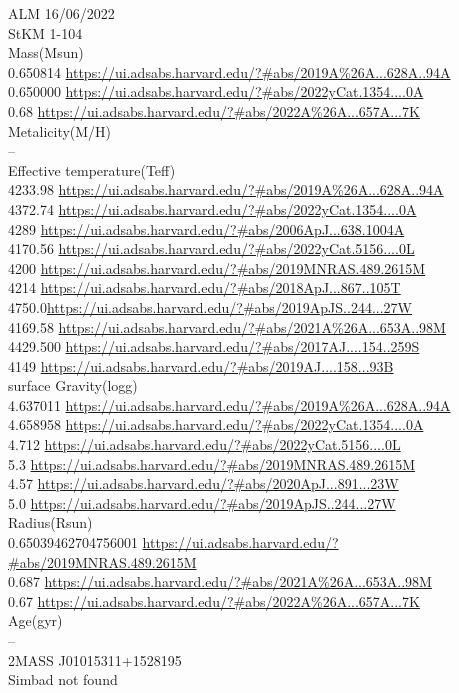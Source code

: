 ALM 16/06/2022\\
StKM 1-104\\
Mass(Msun)\\
0.650814 \url{https://ui.adsabs.harvard.edu/?#abs/2019A%26A...628A..94A}\\
0.650000 \url{https://ui.adsabs.harvard.edu/?#abs/2022yCat.1354....0A}\\
0.68  \url{https://ui.adsabs.harvard.edu/?#abs/2022A%26A...657A...7K}\\
Metalicity(M/H)\\
--\\
Effective temperature(Teff)\\
4233.98 \url{https://ui.adsabs.harvard.edu/?#abs/2019A%26A...628A..94A}\\
4372.74 \url{https://ui.adsabs.harvard.edu/?#abs/2022yCat.1354....0A}\\
4289  \url{https://ui.adsabs.harvard.edu/?#abs/2006ApJ...638.1004A}\\
4170.56 \url{https://ui.adsabs.harvard.edu/?#abs/2022yCat.5156....0L}\\
4200 \url{https://ui.adsabs.harvard.edu/?#abs/2019MNRAS.489.2615M}\\
4214 \url{https://ui.adsabs.harvard.edu/?#abs/2018ApJ...867..105T}\\
4750.0\url{https://ui.adsabs.harvard.edu/?#abs/2019ApJS..244...27W}\\
4169.58 \url{https://ui.adsabs.harvard.edu/?#abs/2021A%26A...653A..98M}\\
4429.500 \url{https://ui.adsabs.harvard.edu/?#abs/2017AJ....154..259S}\\
4149 \url{https://ui.adsabs.harvard.edu/?#abs/2019AJ....158...93B}\\
surface Gravity(logg)\\
4.637011 \url{https://ui.adsabs.harvard.edu/?#abs/2019A%26A...628A..94A}\\
4.658958 \url{https://ui.adsabs.harvard.edu/?#abs/2022yCat.1354....0A}\\
4.712 \url{https://ui.adsabs.harvard.edu/?#abs/2022yCat.5156....0L}\\
5.3 \url{https://ui.adsabs.harvard.edu/?#abs/2019MNRAS.489.2615M}\\
4.57 \url{https://ui.adsabs.harvard.edu/?#abs/2020ApJ...891...23W}\\
5.0 \url{https://ui.adsabs.harvard.edu/?#abs/2019ApJS..244...27W}\\
Radius(Rsun)\\
0.65039462704756001 \url{https://ui.adsabs.harvard.edu/?#abs/2019MNRAS.489.2615M}\\
0.687 \url{https://ui.adsabs.harvard.edu/?#abs/2021A%26A...653A..98M}\\
0.67 \url{https://ui.adsabs.harvard.edu/?#abs/2022A%26A...657A...7K}\\
Age(gyr)\\
--\\
2MASS J01015311+1528195\\
Simbad not found\\

